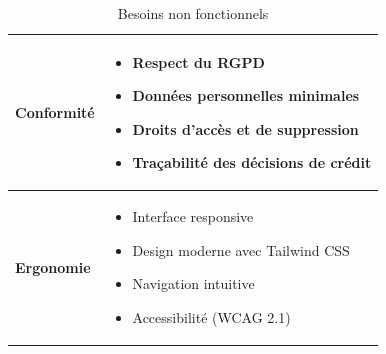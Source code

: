 \documentclass[12pt,a4paper]{report}
\begin{document}
\begin{table}[H]
\begin{tabular}{|p{4cm}|p{10cm}|}
\hline
\textbf{Conformité} & 
\begin{itemize}[leftmargin=0.5cm]
    \item Respect du RGPD
    \item Données personnelles minimales
    \item Droits d'accès et de suppression
    \item Traçabilité des décisions de crédit
\end{itemize} \\
\hline
\textbf{Ergonomie} & 
\begin{itemize}[leftmargin=0.5cm]
    \item Interface responsive
    \item Design moderne avec Tailwind CSS
    \item Navigation intuitive
    \item Accessibilité (WCAG 2.1)
\end{itemize} \\
\hline
\end{tabular}
\caption{Besoins non fonctionnels}
\end{table}
\end{document}
